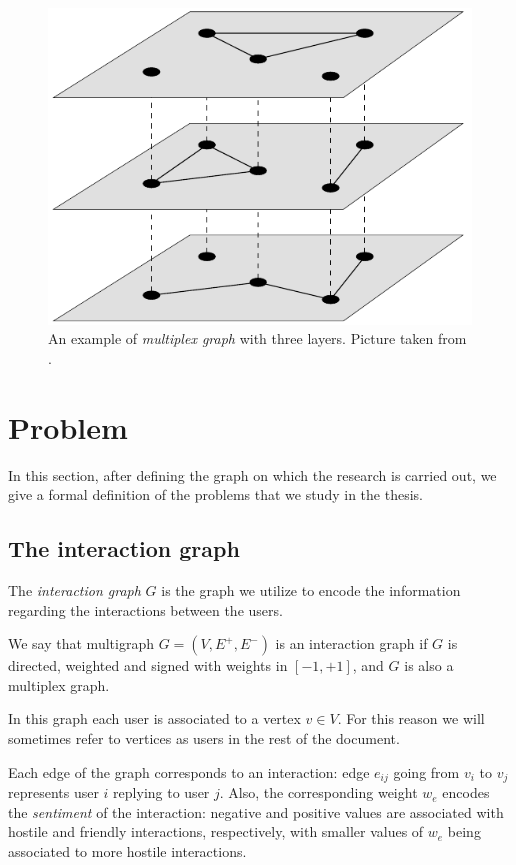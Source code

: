 \begin{figure}
	\centering
	\includegraphics[width=0.4\linewidth]{tex/img/multiplex-graph.png}
	\caption[An example of multiplex graph]{An example of \emph{multiplex
			graph} with three layers. Picture taken from
		\cite{Newman2018}.}%
	\label{fig:tex/img/multiplex-graph}
\end{figure}

\section{Problem}
\label{sec:problem}

In this section, after defining the graph on which the research is
carried out, we give a formal definition of the problems that we
study in the thesis.

\subsection{The interaction graph}
\label{sub:interaction-graph}

The \emph{interaction graph} $G$ is the graph we utilize to encode the
information regarding the interactions between the users.

\begin{definition}
	We say that multigraph $G=(V,E^+,E^-)$ is an interaction graph if $G$ is
	directed, weighted and signed with weights in $[-1,+1]$, and $G$ is also a
	multiplex graph.
\end{definition}

In this graph each user is associated to a vertex $v \in V$. For this reason we
will sometimes refer to vertices as users in the rest of the document.

Each edge of the graph corresponds to an interaction: edge $e_{ij}$
going from $v_i$ to $v_j$ represents user $i$ replying to
user $j$. Also, the corresponding weight $w_e$ encodes the \emph{sentiment} of
the interaction: negative and positive values are associated with hostile and
friendly interactions, respectively, with smaller values of $w_e$ being
associated to more hostile interactions.

